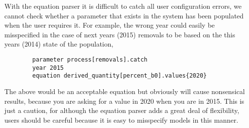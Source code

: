 With the equation parser it is difficult to catch all user configuration errors, we cannot check whether a parameter that exists in the system has been populated when the user requires it. For example, the wrong year could easily be misspecified in the case of next years (2015) removals to be based on the this years (2014) state of the population,
{\small{\begin{verbatim}
		parameter process[removals].catch
		year 2015
		equation derived_quantity[percent_b0].values{2020}
		\end{verbatim}}}
	
The above would be an acceptable equation but obviously will cause nonsensical results, because you are asking for a value in 2020 when you are in 2015. This is just a caution, for although the equation parser adds a great deal of flexibility, users should be careful because it is easy to misspecify models in this manner.
